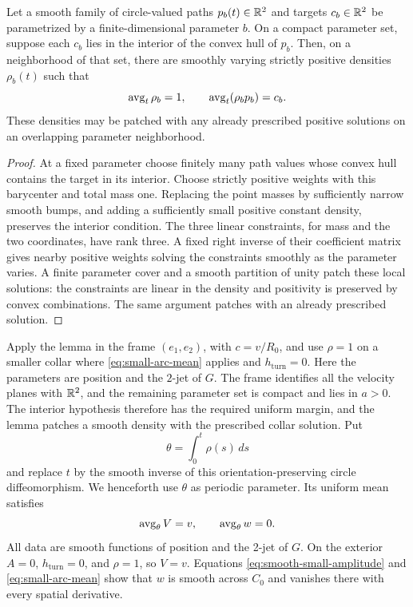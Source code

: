\begin{lemma}
\label{lem:loop-density}
Let a smooth family of circle-valued paths $p_b(t)\in\mathbb{R}^2$ and targets
$c_b\in\mathbb{R}^2$ be parametrized by a finite-dimensional parameter $b$.
On a compact parameter set, suppose each $c_b$ lies in the interior of
the convex hull of $p_b$.  Then, on a neighborhood of that set, there
are smoothly varying strictly positive densities $\rho_b(t)$ such that
\[
 \operatorname{avg}_t\rho_b=1,\qquad \operatorname{avg}_t(\rho_b p_b)=c_b.
\]
These densities may be patched with any already prescribed positive
solutions on an overlapping parameter neighborhood.
\end{lemma}

\begin{proof}
At a fixed parameter choose finitely many path values whose convex hull
contains the target in its interior.  Choose strictly positive weights
with this barycenter and total mass one.  Replacing the point masses by
sufficiently narrow smooth bumps, and adding a sufficiently small
positive constant density, preserves the interior condition.
The three linear constraints, for mass and the two coordinates, have
rank three.  A fixed right inverse of their coefficient matrix gives
nearby positive weights solving the constraints smoothly as the
parameter varies.  A finite parameter cover and a smooth partition of
unity patch these local solutions: the constraints are linear in the
density and positivity is preserved by convex combinations.  The same
argument patches with an already prescribed solution.
\end{proof}

Apply the lemma in the frame $(e_1,e_2)$, with $c=v/R_0$, and use
$\rho=1$ on a smaller collar where
\eqref{eq:small-arc-mean} applies and $h_{\mathrm{turn}}=0$.
Here the parameters are position and the $2$-jet of $G$.  The frame
identifies all the velocity planes with $\mathbb{R}^2$, and the remaining
parameter set is compact and lies in $a>0$.  The interior hypothesis
therefore has the required uniform margin, and the lemma patches a
smooth density with the prescribed collar solution.  Put
\[
 \theta=\int_0^t\rho(s)\,ds
\]
and replace $t$ by the smooth inverse of this orientation-preserving
circle diffeomorphism.  We henceforth use $\theta$ as periodic parameter.
Its uniform mean satisfies
\begin{equation}
 \operatorname{avg}_\theta V=v,\qquad \operatorname{avg}_\theta w=0.
 \label{eq:velocity-mean}
\end{equation}
All data are smooth functions of position and the 2-jet of $G$.
On the exterior $A=0$, $h_{\mathrm{turn}}=0$, and $\rho=1$, so $V=v$.
Equations \eqref{eq:smooth-small-amplitude} and
\eqref{eq:small-arc-mean} show that $w$ is smooth across $C_0$ and
vanishes there with every spatial derivative.


